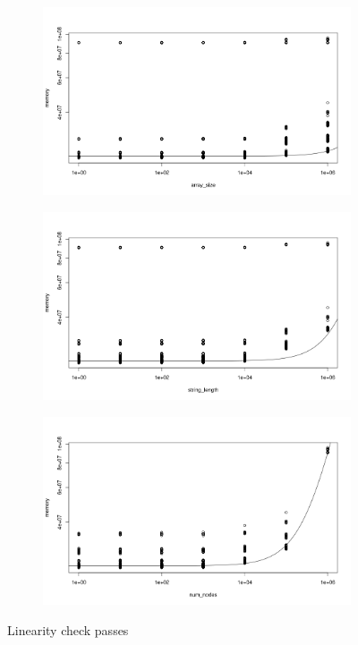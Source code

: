 \documentclass{article}
\begin{document}
\begin{figure}
  \centering
   \begin{subfigure}{0.49\textwidth}
    \centering
    \includegraphics[width=\textwidth]{../io_local_tests/linear_fit1.png}
  \end{subfigure}
   \begin{subfigure}{0.49\textwidth}
    \centering
    \includegraphics[width=\textwidth]{../io_local_tests/linear_fit2.png}
  \end{subfigure}
   \begin{subfigure}{0.49\textwidth}
    \centering
    \includegraphics[width=\textwidth]{../io_local_tests/linear_fit3.png}
  \end{subfigure}
  \caption{Linearity check passes}
\end{figure}
\end{document}
